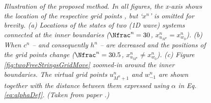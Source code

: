 \begin{figure}[t]
    \centering
    \\
    \vspace{-1em}\\
    \vspace{-1em}
    \vspace{-1em}\caption{\it Illustration of the proposed method. In all figures, the x-axis shows the location of the respective grid points%
    , but `$x^n$' is omitted for brevity. (a) Locations of the states of two (1D wave) systems connected at the inner boundaries ($\Nfrac^n = 30$, $x_{u_{M^n}}^n = x_{w_0}^n$). (b) When $c^n$ -- and consequently $h^n$ -- are decreased and the positions of the grid points change ($\Nfrac^n = 30.5$, $x_{u_{M^n}}^n \neq x_{w_0}^n$). (c) Figure \ref{fig:twoFreeStringsGridMove} zoomed-in around the inner boundaries. The virtual grid points $u_{M^n+1}^n$ and $w_{-1}^n$ are shown together with the distance between them expressed using $\alpha$ in Eq. \eqref{eq:alphaDef}. (Taken from paper \citeP[G].)\label{fig:twoFreeStringsFull}}
\end{figure}
